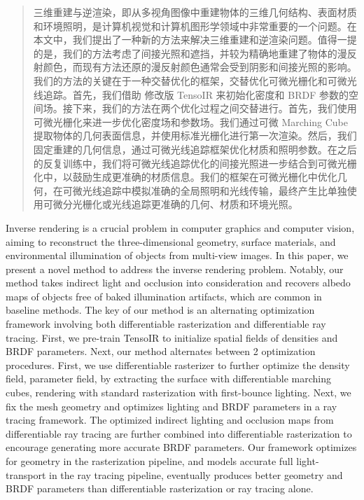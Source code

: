 

\begin{abstract}
  三维重建与逆渲染，即从多视角图像中重建物体的三维几何结构、表面材质和环境照明，是计算机视觉和计算机图形学领域中非常重要的一个问题。在本文中，我们提出了一种新的方法来解决三维重建和逆渲染问题。值得一提的是，我们的方法考虑了间接光照和遮挡，并较为精确地重建了物体的漫反射颜色，而现有方法还原的漫反射颜色通常会受到阴影和间接光照的影响。我们的方法的关键在于一种交替优化的框架，交替优化可微光栅化和可微光线追踪。首先，我们借助 修改版 TensoIR 来初始化密度和 BRDF 参数的空间场。接下来，我们的方法在两个优化过程之间交替进行。首先，我们使用可微光栅化来进一步优化密度场和参数场。我们通过可微 Marching Cube 提取物体的几何表面信息，并使用标准光栅化进行第一次渲染。然后，我们固定重建的几何信息，通过可微光线追踪框架优化材质和照明参数。在之后的反复训练中，我们将可微光线追踪优化的间接光照进一步结合到可微光栅化中，以鼓励生成更准确的材质信息。我们的框架在可微光栅化中优化几何，在可微光线追踪中模拟准确的全局照明和光线传输，最终产生比单独使用可微分光栅化或光线追踪更准确的几何、材质和环境光照。
\end{abstract}

\begin{abstract*}
  Inverse rendering is a crucial problem in computer graphics and computer vision, aiming to reconstruct the three-dimensional geometry, surface materials, and environmental illumination of objects from multi-view images. In this paper, we present a novel method to address the inverse rendering problem. Notably, our method takes indirect light and occlusion into consideration and recovers albedo maps of objects free of baked illumination artifacts, which are common in baseline methods. The key of our method is an alternating optimization framework involving both differentiable rasterization and differentiable ray tracing. First, we pre-train TensoIR to initialize spatial fields of densities and BRDF parameters. Next, our method alternates between 2 optimization procedures. First, we use differentiable rasterizer to further optimize the density field, parameter field, by extracting the surface with differentiable marching cubes, rendering with standard rasterization with first-bounce lighting. Next, we fix the mesh geometry and optimizes lighting and BRDF parameters in a ray tracing framework. The optimized indirect lighting and occlusion maps from differentiable ray tracing are further combined into differentiable rasterization to encourage generating more accurate BRDF parameters. Our framework optimizes for geometry in the rasterization pipeline, and models accurate full light-transport in the ray tracing pipeline, eventually produces better geometry and BRDF parameters than differentiable rasterization or ray tracing alone.

\end{abstract*}
